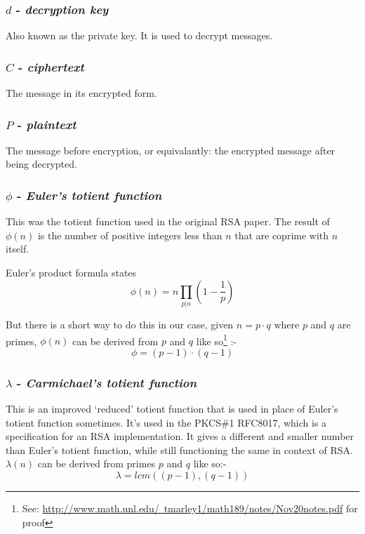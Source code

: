 \documentclass[twocolumn, a4paper,12pt]{article}
\begin{document}
\subsubsection{\texorpdfstring{$d$}{d} - \emph{decryption key}}
Also known as the private key. It is used to decrypt messages.

\subsubsection{\texorpdfstring{$C$}{C} - \emph{ciphertext}}
The message in its encrypted form.

\subsubsection{\texorpdfstring{$P$}{P} - \emph{plaintext}}
The message before encryption, or equivalantly: the encrypted message after being decrypted.

\subsubsection{\texorpdfstring{$\phi$}{phi} - \emph{Euler's totient function}}
This was the totient function used in the original RSA paper.\cite{Rivest1978} 
The result of $\phi (n) $ is the number of positive integers less than $n$ that are coprime with $n$ itself. 

Euler's product formula states
\[ \phi(n) = n \prod\limits_{p | n}{(1-\frac{1}{p})}\]

But there is a short
way to do this in our case, given $n=p \cdot q$ where $p$ and $q$ are primes, $\phi (n)$ can
be derived from $p$ and $q$ like so\footnote{See: \href{http://www.math.unl.edu/~tmarley1/math189/notes/Nov20notes.pdf} {http://www.math.unl.edu/~tmarley1/math189/notes/Nov20notes.pdf} for proof} 
:-
\[ \phi = (p - 1) \cdot (q - 1) \]

\subsubsection{\texorpdfstring{$\lambda$}{lambda} - \emph{Carmichael's totient function}}
This is an improved `reduced' totient function that is used in
place of Euler's totient function sometimes. It's used in the PKCS\#1 RFC8017\cite{rfc8017}, which is a specification for an RSA implementation. It gives
a different and smaller number than Euler's totient function, while
still functioning the same in context of RSA. $\lambda (n)$ can
be derived from primes $p$ and $q$ like so:-
\[ \lambda = lcm( (p - 1) , (q - 1) ) \]
\end{document}
